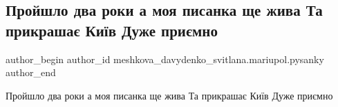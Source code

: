  
 
 
 
 

\subsection{Пройшло два роки а моя писанка ще жива Та прикрашає Київ Дуже приємно}
\label{sec:17_04_2018.fb.meshkova_davydenko_svitlana.mariupol.pysanky.1.projshlo_dva_roky_a_moja_pysanka_sche_zhyva}

\ifcmt
 author_begin
   author_id meshkova_davydenko_svitlana.mariupol.pysanky
 author_end
\fi

Пройшло два роки а моя писанка ще жива Та прикрашає Київ Дуже приємно

